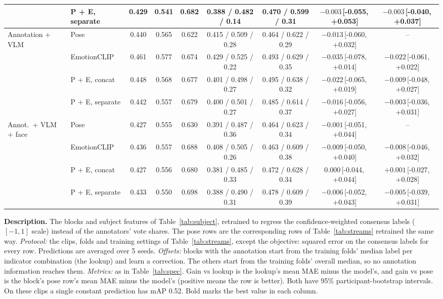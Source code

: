 \documentclass[11pt]{article}
\newcommand{\ci}[2]{\,[#1,\,#2]}
\newcommand{\tabledesc}[1]{\par\medskip\begin{minipage}{\linewidth}\footnotesize\textbf{Description.} #1\end{minipage}}
\begin{document}
\begin{table}[!htbp]
{\begin{tabular}{llccccccc}
 & P + E, separate & 0.429 & 0.541 & 0.682 & 0.388 / 0.482 / 0.14 & 0.470 / 0.599 / 0.31 & $-0.003$\ci{-0.055}{+0.053} & $-0.003$\ci{-0.040}{+0.037} \\
\midrule
\multirow{4}{*}{Annotation + VLM} & Pose & 0.440 & 0.565 & 0.622 & 0.415 / 0.509 / 0.28 & 0.464 / 0.622 / 0.29 & $-0.013$\ci{-0.060}{+0.032} & -- \\
 & EmotionCLIP & 0.461 & 0.577 & 0.674 & 0.429 / 0.525 / 0.22 & 0.493 / 0.629 / 0.35 & $-0.035$\ci{-0.078}{+0.014} & $-0.022$\ci{-0.061}{+0.022} \\
 & P + E, concat & 0.448 & 0.568 & 0.677 & 0.401 / 0.498 / 0.27 & 0.495 / 0.638 / 0.32 & $-0.022$\ci{-0.065}{+0.019} & $-0.009$\ci{-0.048}{+0.027} \\
 & P + E, separate & 0.442 & 0.557 & 0.679 & 0.400 / 0.501 / 0.27 & 0.485 / 0.614 / 0.37 & $-0.016$\ci{-0.056}{+0.027} & $-0.003$\ci{-0.036}{+0.031} \\
\midrule
\multirow{4}{*}{Annot.\ + VLM + face} & Pose & 0.427 & 0.555 & 0.630 & 0.391 / 0.487 / 0.36 & 0.464 / 0.623 / 0.34 & $-0.001$\ci{-0.051}{+0.044} & -- \\
 & EmotionCLIP & 0.436 & 0.557 & 0.688 & 0.408 / 0.505 / 0.26 & 0.463 / 0.609 / 0.38 & $-0.009$\ci{-0.050}{+0.040} & $-0.008$\ci{-0.046}{+0.032} \\
 & P + E, concat & 0.427 & 0.556 & 0.680 & 0.381 / 0.485 / 0.33 & 0.472 / 0.628 / 0.34 & $0.000$\ci{-0.044}{+0.044} & $+0.001$\ci{-0.027}{+0.028} \\
 & P + E, separate & 0.433 & 0.550 & 0.698 & 0.388 / 0.490 / 0.31 & 0.478 / 0.609 / 0.39 & $-0.006$\ci{-0.052}{+0.043} & $-0.005$\ci{-0.039}{+0.031} \\
\bottomrule
\end{tabular}%
}
\tabledesc{The blocks and subject features of Table~\ref{tab:subject}, retrained to regress the confidence-weighted consensus labels ($[-1, 1]$ scale) instead of the annotators' vote shares. The pose rows are the corresponding rows of Table~\ref{tab:streams} retrained the same way.
\emph{Protocol:} the clips, folds and training settings of Table~\ref{tab:streams}, except the objective: squared error on the consensus labels for every row. Predictions are averaged over 5 seeds.
\emph{Offsets:} blocks with the annotation start from the training folds' median label per indicator combination (the lookup) and learn a correction. The others start from the training folds' overall median, so no annotation information reaches them.
\emph{Metrics:} as in Table~\ref{tab:spec}. Gain vs lookup is the lookup's mean MAE minus the model's, and gain vs pose is the block's pose row's mean MAE minus the model's (positive means the row is better). Both have 95\% participant-bootstrap intervals. On these clips a single constant prediction has mAP 0.52. Bold marks the best value in each column.
}
\end{table}
\end{document}
